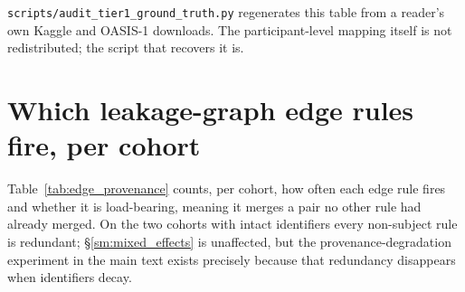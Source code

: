 \documentclass[11pt]{article}
\providecommand{\pb}{\discretionary{}{}{}}
\begin{document}
\texttt{scripts/\pb audit\_\pb tier1\_\pb ground\_\pb truth.py} regenerates this table from a
reader's own Kaggle and OASIS-1 downloads. The participant-level mapping
itself is not redistributed; the script that recovers it is.

\section{Which leakage-graph edge rules fire, per cohort}

Table~\ref{tab:edge_provenance} counts, per cohort, how often each edge rule fires and whether it is load-bearing, meaning it merges a pair no other rule had already merged. On the two cohorts with intact identifiers every non-subject rule is redundant; \S\ref{sm:mixed_effects} is unaffected, but the provenance-degradation experiment in the main text exists precisely because that redundancy disappears when identifiers decay.
\end{document}

